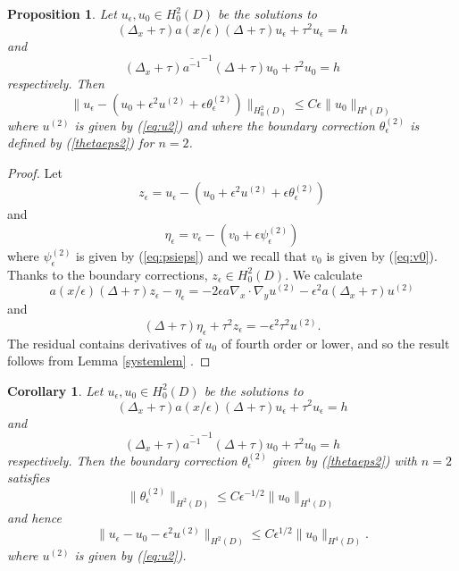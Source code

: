\documentclass[12pt]{article}
\newtheorem{proposition}{Proposition}
\newtheorem{corollary}{Corollary}
\begin{document}
\begin{proposition}\label{h2est} Let $u_\epsilon, u_0 \in H^2_0( D)$  be the solutions to 
\begin{equation} \label{fourthordeqest}  (\Delta_x +\tau) a(x/\epsilon) (\Delta +\tau) u_\epsilon +\tau^2 u_\epsilon= h \end{equation}
and
\begin{equation} \label{homogeqest}  (\Delta_x +\tau) \overline{a^{-1}}^{-1} (\Delta +\tau) u_0 +\tau^2 u_0= h \end{equation}
respectively. Then 
$$ \| u_\epsilon -(u_0 +\epsilon^2 u^{(2)}  +\epsilon \theta_\epsilon^{(2)}) \|_{H_0^2( D)} \leq C\epsilon \| u_0 \|_{H^4( D)} $$
where $u^{(2)}$ is given by (\ref{eq:u2}) and where the boundary correction $\theta^{(2)}_\epsilon$ is defined by (\ref{thetaeps2}) for $n=2$. 
\end{proposition} 
\begin{proof} Let 
$$ z_\epsilon =  u_\epsilon -(u_0 +\epsilon^2 u^{(2)}  +\epsilon\theta_\epsilon^{(2)} ) $$
and $$ \eta_\epsilon = v_\epsilon -(v_0 + \epsilon  \psi_\epsilon^{(2)}  )$$
where $\psi_\epsilon^{(2)}$ is given by (\ref{eq:psieps}) and we recall that $v_0$ is given by (\ref{eq:v0}).  Thanks to the boundary corrections, $z_\epsilon\in H^2_0( D)$. We calculate 
\begin{equation} a(x/\epsilon) (\Delta +\tau )z_\epsilon - \eta_\epsilon  = -2\epsilon  a \nabla_x\cdot\nabla_y u^{(2)} - \epsilon^2 a(\Delta_x+\tau)u^{(2)}  \label{useforeta1} \end{equation}
and
\begin{equation} (\Delta +\tau )\eta_\epsilon  +\tau^2 z_\epsilon = -\epsilon^2 \tau^2 u^{(2)} .\label{useforeta2} \end{equation}
The residual contains derivatives of $u_0$ of fourth order or lower, and so the result follows from Lemma \ref{systemlem} . 
\end{proof}
\noindent
\begin{corollary} \label{h2cor} Let $u_\epsilon, u_0 \in H^2_0( D)$  be the solutions to 
\begin{equation} \label{fourthordeqest2}  (\Delta_x +\tau) a(x/\epsilon) (\Delta +\tau) u_\epsilon +\tau^2 u_\epsilon= h \end{equation}
and
\begin{equation} \label{homogeqest2}  (\Delta_x +\tau) \overline{a^{-1}}^{-1} (\Delta +\tau) u_0 +\tau^2 u_0= h \end{equation}
respectively. Then the boundary correction $\theta_\epsilon^{(2)}$  given by (\ref{thetaeps2}) with $n=2$ satisfies 
$$\| \theta_\epsilon^{(2)}\|_{H^2( D)}\leq C\epsilon^{-1/2}\| u_0\|_{H^4( D)}$$
and hence 
$$ \| u_\epsilon - u_0 -\epsilon^2 u^{(2)}\|_{H^2( D)} \leq C\epsilon^{1/2} \| u_0 \|_{H^4( D)} .$$
where $u^{(2)}$ is given by (\ref{eq:u2}). 
\end{corollary} 
\end{document}
